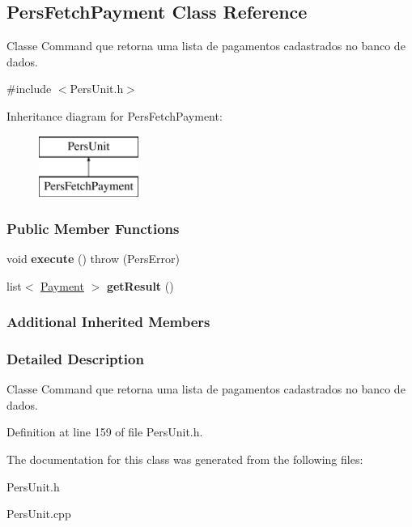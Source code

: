 \hypertarget{classPersFetchPayment}{\subsection{Pers\-Fetch\-Payment Class Reference}
\label{d6/d08/classPersFetchPayment}
}


Classe Command que retorna uma lista de pagamentos cadastrados no banco de dados.  




{\ttfamily \#include $<$Pers\-Unit.\-h$>$}

Inheritance diagram for Pers\-Fetch\-Payment\-:\begin{figure}[H]
\begin{center}
\leavevmode
\includegraphics[height=2.000000cm]{d6/d08/classPersFetchPayment}
\end{center}
\end{figure}
\subsubsection*{Public Member Functions}
\begin{DoxyCompactItemize}
\item 
\hypertarget{classPersFetchPayment_a5d2e631be69299b14ee9634cb5fbf56f}{void {\bfseries execute} ()  throw (\-Pers\-Error)}\label{d6/d08/classPersFetchPayment_a5d2e631be69299b14ee9634cb5fbf56f}

\item 
\hypertarget{classPersFetchPayment_a238f366d821711dd7aba421c1a581c0a}{list$<$ \hyperlink{classPayment}{Payment} $>$ {\bfseries get\-Result} ()}\label{d6/d08/classPersFetchPayment_a238f366d821711dd7aba421c1a581c0a}

\end{DoxyCompactItemize}
\subsubsection*{Additional Inherited Members}


\subsubsection{Detailed Description}
Classe Command que retorna uma lista de pagamentos cadastrados no banco de dados. 

Definition at line 159 of file Pers\-Unit.\-h.



The documentation for this class was generated from the following files\-:\begin{DoxyCompactItemize}
\item 
Pers\-Unit.\-h\item 
Pers\-Unit.\-cpp\end{DoxyCompactItemize}
